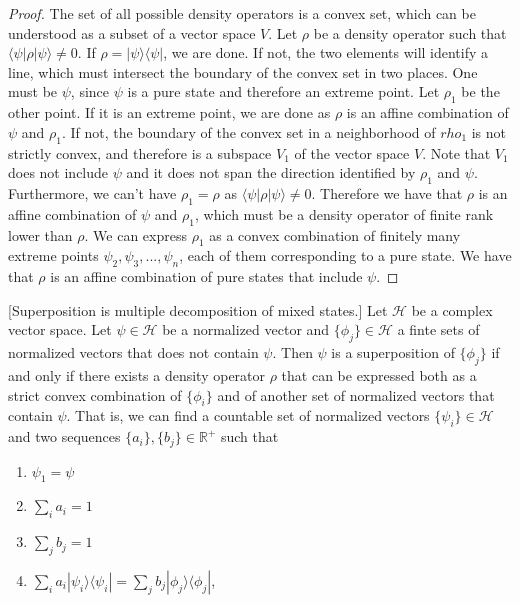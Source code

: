 \documentclass[10pt,twocolumn, nofootinbib]{revtex4-2}
\def\>{\rangle}
\def\<{\langle}
\begin{document}
\begin{proof}
	The set of all possible density operators is a convex set, which can be understood as a subset of a vector space $V$. Let $\rho$ be a density operator such that $\<\psi|\rho|\psi\>\neq 0$. If $\rho = |\psi\>\<\psi|$, we are done. If not, the two elements will identify a line, which must intersect the boundary of the convex set in two places. One must be $\psi$, since $\psi$ is a pure state and therefore an extreme point. Let $\rho_1$ be the other point. If it is an extreme point, we are done as $\rho$ is an affine combination of $\psi$ and $\rho_1$. If not, the boundary of the convex set in a neighborhood of $rho_1$ is not strictly convex, and therefore is a subspace $V_1$ of the vector space $V$. Note that $V_1$ does not include $\psi$ and it does not span the direction identified by $\rho_1$ and $\psi$. Furthermore, we can't have $\rho_1 = \rho$ as $\<\psi|\rho|\psi\>\neq 0$. Therefore we have that $\rho$ is an affine combination of $\psi$ and $\rho_1$, which must be a density operator of finite rank lower than $\rho$. We can express $\rho_1$ as a convex combination of finitely many extreme points $\psi_2, \psi_3, ..., \psi_n$, each of them corresponding to a pure state. We have that $\rho$ is an affine combination of pure states that include $\psi$.
\end{proof}

\begin{prop}\label{prop_superpositionIsDecomposition}[Superposition is multiple decomposition of mixed states.]
Let $\mathcal{H}$ be a complex vector space. Let $\psi \in \mathcal{H}$ be a normalized vector and $\{\phi_j\} \in \mathcal{H}$ a finte sets of normalized vectors that does not contain $\psi$. Then $\psi$ is a superposition of $\{\phi_j\}$ if and only if there exists a density operator $\rho$ that can be expressed both as a strict convex combination of $\{\phi_i\}$ and of another set of normalized vectors that contain $\psi$. That is, we can find a countable set of normalized vectors $\{\psi_i\} \in \mathcal{H}$ and two sequences $\{a_i\}, \{b_j\} \in \mathbb{R}^+$ such that
\begin{enumerate}
	\item $\psi_1 = \psi$
	\item $\sum_i a_i = 1$
	\item $\sum_j b_j = 1$
	\item $\sum_i a_i |\psi_i\>\<\psi_i| = \sum_j b_j |\phi_j\>\<\phi_j|$,
\end{enumerate}
\end{prop}
\end{document}
